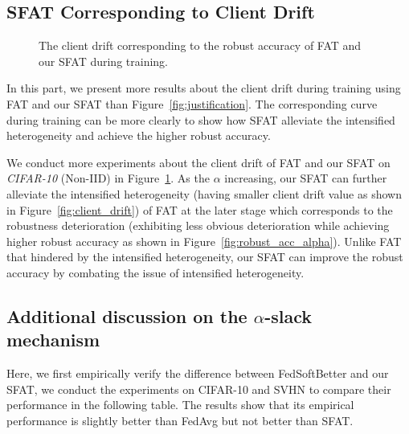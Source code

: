 \documentclass{article} %
\theoremstyle{plain}
\theoremstyle{definition}
\theoremstyle{remark}
\begin{document}
\subsection{SFAT Corresponding to Client Drift}
\label{client_drift}

\vspace{3mm}
\begin{figure}[ht]
    \centering
    \hspace{0.2in}
    \caption{The client drift corresponding to the robust accuracy of FAT and our SFAT during training.}
    \label{fig:client_drift_app}
\end{figure}
\vspace{4mm}


In this part, we present more results about the client drift during training using FAT and our SFAT than Figure~\ref{fig:justification}. The corresponding curve during training can be more clearly to show how SFAT alleviate the intensified heterogeneity and achieve the higher robust accuracy.

We conduct more experiments about the client drift of FAT and our SFAT on \textit{CIFAR-10} (Non-IID) in Figure~\ref{fig:client_drift_app}. As the $\alpha$ increasing, our SFAT can further alleviate the intensified heterogeneity (having smaller client drift value as shown in Figure~\ref{fig:client_drift}) of FAT at the later stage which corresponds to the robustness deterioration (exhibiting less obvious deterioration while achieving higher robust accuracy as shown in Figure~\ref{fig:robust_acc_alpha}). Unlike FAT that hindered by the intensified heterogeneity, our SFAT can improve the robust accuracy by combating the issue of intensified heterogeneity.

\subsection{Additional discussion on the \texorpdfstring{$\alpha$}{a}-slack mechanism}
\label{app:schedule}


Here, we first empirically verify the difference between FedSoftBetter and our SFAT, we conduct the experiments on CIFAR-10 and SVHN to compare their performance in the following table. The results show that its empirical performance is slightly better than FedAvg but not better than SFAT.
\end{document}
